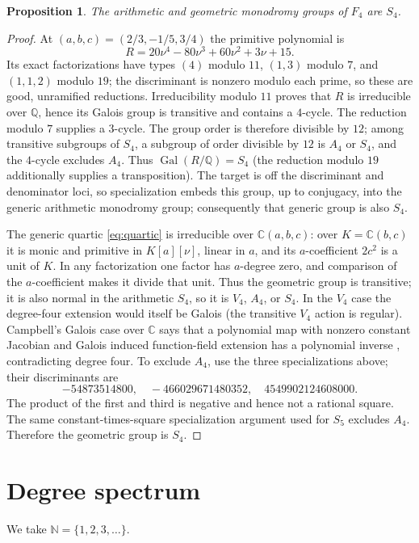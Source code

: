 \documentclass[11pt]{amsart}
\newtheorem{proposition}[theorem]{Proposition}
\theoremstyle{remark}
\newcommand{\C}{\mathbb C}
\newcommand{\Q}{\mathbb Q}
\newcommand{\N}{\mathbb N}
\begin{document}
\begin{proposition}\label{prop:S4}
The arithmetic and geometric monodromy groups of $F_4$ are $S_4$.
\end{proposition}
\begin{proof}
At $(a,b,c)=(2/3,-1/5,3/4)$ the primitive polynomial is
\[
 R=20\nu^4-80\nu^3+60\nu^2+3\nu+15.
\]
Its exact factorizations have types $(4)$ modulo $11$, $(1,3)$ modulo $7$, and $(1,1,2)$ modulo $19$; the discriminant is nonzero modulo each prime, so these are good, unramified reductions.  Irreducibility modulo $11$ proves that $R$ is irreducible over $\Q$, hence its Galois group is transitive and contains a $4$-cycle.  The reduction modulo $7$ supplies a $3$-cycle.  The group order is therefore divisible by $12$; among transitive subgroups of $S_4$, a subgroup of order divisible by $12$ is $A_4$ or $S_4$, and the $4$-cycle excludes $A_4$.  Thus $\operatorname{Gal}(R/\Q)=S_4$ (the reduction modulo $19$ additionally supplies a transposition).  The target is off the discriminant and denominator loci, so specialization embeds this group, up to conjugacy, into the generic arithmetic monodromy group; consequently that generic group is also $S_4$.

The generic quartic \eqref{eq:quartic} is irreducible over $\C(a,b,c)$: over $K=\C(b,c)$ it is monic and primitive in $K[a][\nu]$, linear in $a$, and its $a$-coefficient $2c^2$ is a unit of $K$.  In any factorization one factor has $a$-degree zero, and comparison of the $a$-coefficient makes it divide that unit.  Thus the geometric group is transitive; it is also normal in the arithmetic $S_4$, so it is $V_4$, $A_4$, or $S_4$.  In the $V_4$ case the degree-four extension would itself be Galois (the transitive $V_4$ action is regular).  Campbell's Galois case over $\C$ says that a polynomial map with nonzero constant Jacobian and Galois induced function-field extension has a polynomial inverse \cite{Campbell73,Campbell13}, contradicting degree four.  To exclude $A_4$, use the three specializations above; their discriminants are
\[
 -54873514800,
 \quad -466029671480352,
 \quad 4549902124608000.
\]
The product of the first and third is negative and hence not a rational square.  The same constant-times-square specialization argument used for $S_5$ excludes $A_4$.  Therefore the geometric group is $S_4$.
\end{proof}

\section{Degree spectrum}
We take $\N=\{1,2,3,\ldots\}$.
\end{document}
